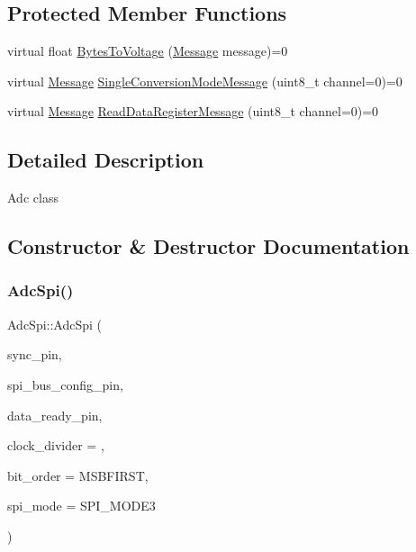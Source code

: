 \subsection*{Protected Member Functions}
\begin{DoxyCompactItemize}
\item 
virtual float \mbox{\hyperlink{classAdcSpi_aa9970471c6fc505e4b91ac6985ac1489}{Bytes\+To\+Voltage}} (\mbox{\hyperlink{structAdcSpi_1_1Message}{Message}} message)=0
\item 
virtual \mbox{\hyperlink{structAdcSpi_1_1Message}{Message}} \mbox{\hyperlink{classAdcSpi_ac6a6421e3045c986c6997019a04d11ea}{Single\+Conversion\+Mode\+Message}} (uint8\+\_\+t channel=0)=0
\item 
virtual \mbox{\hyperlink{structAdcSpi_1_1Message}{Message}} \mbox{\hyperlink{classAdcSpi_acd92eec341ed010e5b7569ffcbba811d}{Read\+Data\+Register\+Message}} (uint8\+\_\+t channel=0)=0
\end{DoxyCompactItemize}


\subsection{Detailed Description}
Adc class 

\subsection{Constructor \& Destructor Documentation}
\mbox{\label{classAdcSpi_a5b3afab7dc4a788e1caf6a1277b67df9}} 
\subsubsection{\texorpdfstring{Adc\+Spi()}{AdcSpi()}}
{\footnotesize\ttfamily Adc\+Spi\+::\+Adc\+Spi (\begin{DoxyParamCaption}\item[{uint8\+\_\+t}]{sync\+\_\+pin,  }\item[{uint8\+\_\+t}]{spi\+\_\+bus\+\_\+config\+\_\+pin,  }\item[{uint8\+\_\+t}]{data\+\_\+ready\+\_\+pin,  }\item[{uint8\+\_\+t}]{clock\+\_\+divider = {},  }\item[{Bit\+Order}]{bit\+\_\+order = {\ttfamily MSBFIRST},  }\item[{uint8\+\_\+t}]{spi\+\_\+mode = {\ttfamily SPI\+\_\+MODE3} }\end{DoxyParamCaption})}

